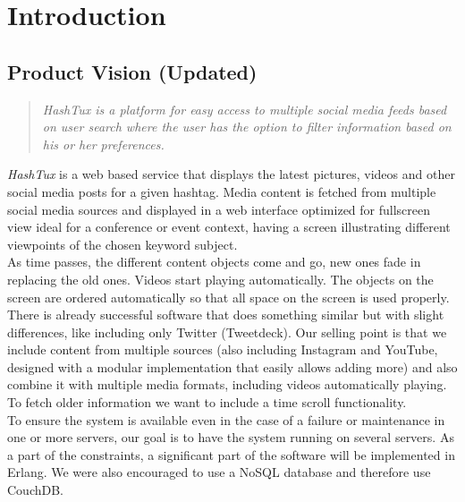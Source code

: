 \chapter{Introduction}

\section{Product Vision (Updated)}
\begin{quote}
\textit{HashTux is a platform for easy access to multiple social
media feeds based on user search where the user has the option to filter
information based on his or her preferences.}
\end{quote}
{\it HashTux} is a web based service that displays the latest pictures, videos
and other social media posts for a given hashtag. Media content is fetched from
multiple social media sources and displayed in a web interface optimized for
fullscreen view ideal for a conference or event context, having a screen
illustrating different viewpoints of the chosen keyword subject. \\

As time passes, the different content objects come and go, new ones fade in
replacing the old ones. Videos start playing automatically. The objects on the
screen are ordered automatically so that all space on the screen is used
properly. \\

There is already successful software that does something similar but with slight
differences, like including only Twitter (Tweetdeck). Our selling point is that
we include content from multiple sources (also including Instagram and YouTube,
designed with a modular implementation that easily allows adding more) and also
combine it with multiple media formats, including videos automatically playing.
To fetch older information we want to include a time scroll functionality. \\

To ensure the system is available even in the case of a failure or maintenance
in one or more servers, our goal is to have the system running on several
servers. As a part of the constraints, a significant part of the software will
be implemented in Erlang. We were also encouraged to use a NoSQL database and
therefore use CouchDB. \newpage

